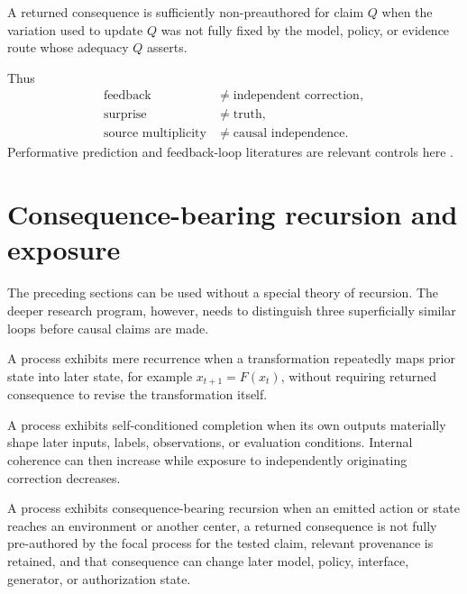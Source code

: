\begin{definition}
A returned consequence is sufficiently non-preauthored for claim $Q$ when the variation used to update $Q$ was not fully fixed by the model, policy, or evidence route whose adequacy $Q$ asserts.
\end{definition}

Thus
\begin{align}
\text{feedback}&\neq\text{independent correction},\nonumber\\
\text{surprise}&\neq\text{truth},\nonumber\\
\text{source multiplicity}&\neq\text{causal independence}.
\end{align}
Performative prediction and feedback-loop literatures are relevant controls here \cite{PerdomoEtAl2020}.

\section{Consequence-bearing recursion and exposure}
\label{sec:deep-recursion}

The preceding sections can be used without a special theory of recursion. The deeper research program, however, needs to distinguish three superficially similar loops before causal claims are made.

\begin{definition}
A process exhibits mere recurrence when a transformation repeatedly maps prior state into later state, for example $x_{t+1}=F(x_t)$, without requiring returned consequence to revise the transformation itself.
\end{definition}

\begin{definition}
A process exhibits self-conditioned completion when its own outputs materially shape later inputs, labels, observations, or evaluation conditions. Internal coherence can then increase while exposure to independently originating correction decreases.
\end{definition}

\begin{definition}
A process exhibits consequence-bearing recursion when an emitted action or state reaches an environment or another center, a returned consequence is not fully pre-authored by the focal process for the tested claim, relevant provenance is retained, and that consequence can change later model, policy, interface, generator, or authorization state.
\end{definition}


